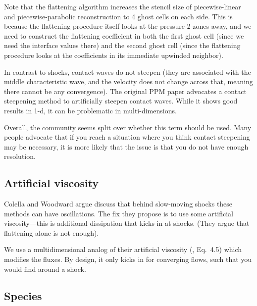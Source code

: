   Note that the flattening algorithm increases the stencil size of
  piecewise-linear and piecewise-parabolic reconstruction to 4 ghost cells
  on each side.  This is because the flattening procedure itself looks
  at the pressure 2 zones away, and we need to construct the flattening
  coefficient in both the first ghost cell (since we need the interface
  values there) and the second ghost cell (since the flattening procedure
  looks at the coefficients in its immediate upwinded neighbor).

  In contrast to shocks, contact waves
  do not steepen (they are associated with the middle characteristic
  wave, and the velocity does not change across that, meaning there
  cannot be any convergence).  The original PPM
  paper advocates a contact steepening method to artificially steepen
  contact waves.  While it shows good results in 1-d, it can be
  problematic in multi-dimensions.

  Overall, the community seems split over whether this term should be
  used.  Many people advocate that if you reach a situation where you
  think contact steepening may be necessary, it is more likely that
  the issue is that you do not have enough resolution.


\subsection{Artificial viscosity}

  Colella and Woodward argue discuss
  that behind slow-moving shocks these methods can have oscillations.
  The fix they propose is to use some artificial viscosity---this is
  additional dissipation that kicks in at shocks.  (They argue that
  flattening alone is not enough).

  We use a multidimensional analog of their artificial viscosity
  (\cite{colellawoodward:1984}, Eq.\ 4.5) which modifies the fluxes.
  By design, it only kicks in for converging flows, such that you
  would find around a shock.


\subsection{Species}

